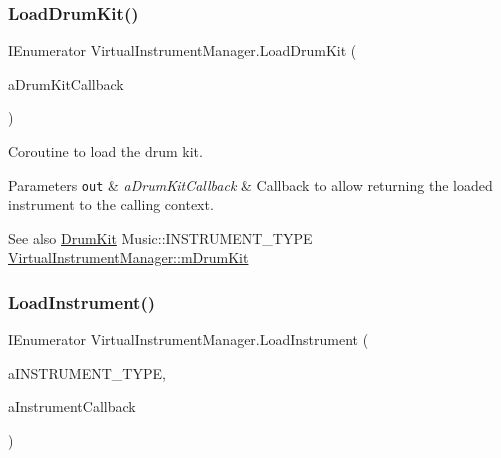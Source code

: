 \subsubsection{\texorpdfstring{Load\+Drum\+Kit()}{LoadDrumKit()}}
{\footnotesize\ttfamily I\+Enumerator Virtual\+Instrument\+Manager.\+Load\+Drum\+Kit (\begin{DoxyParamCaption}\item[{System.\+Action$<$ \hyperlink{class_virtual_instrument}{Virtual\+Instrument} $>$}]{a\+Drum\+Kit\+Callback }\end{DoxyParamCaption})\hspace{0.3cm}{\ttfamily [private]}}



Coroutine to load the drum kit. 


\begin{DoxyParams}[1]{Parameters}
\mbox{\tt out}  & {\em a\+Drum\+Kit\+Callback} & Callback to allow returning the loaded instrument to the calling context.\\
\hline
\end{DoxyParams}
\begin{DoxySeeAlso}{See also}
\hyperlink{class_drum_kit}{Drum\+Kit} Music\+::\+I\+N\+S\+T\+R\+U\+M\+E\+N\+T\+\_\+\+T\+Y\+PE \hyperlink{group___virtual_instrument_manager_event_types_ga0bc7c9f776b0d2dae0ccb1f1ee5f2143}{Virtual\+Instrument\+Manager\+::m\+Drum\+Kit} 
\end{DoxySeeAlso}
\mbox{\label{group___virtual_instrument_manager_event_types_gab8082c1cc590771bf57da8b5ae8603d1}} 
\subsubsection{\texorpdfstring{Load\+Instrument()}{LoadInstrument()}}
{\footnotesize\ttfamily I\+Enumerator Virtual\+Instrument\+Manager.\+Load\+Instrument (\begin{DoxyParamCaption}\item[{Music.\+I\+N\+S\+T\+R\+U\+M\+E\+N\+T\+\_\+\+T\+Y\+PE}]{a\+I\+N\+S\+T\+R\+U\+M\+E\+N\+T\+\_\+\+T\+Y\+PE,  }\item[{System.\+Action$<$ \hyperlink{class_virtual_instrument}{Virtual\+Instrument} $>$}]{a\+Instrument\+Callback }\end{DoxyParamCaption})\hspace{0.3cm}{\ttfamily [private]}}



